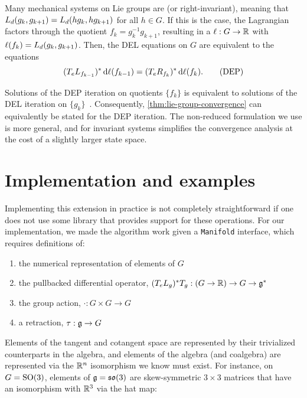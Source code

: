 \begin{remark}\label{rmk:lie-DEP}
	Many mechanical systems on Lie groups are  (or right-invariant), meaning that $L_d(g_k, g_{k+1}) = L_d(h g_k, h g_{k+1})$ for all $h \in G$. If this is the case, the Lagrangian factors through the quotient $f_k = g_k^{-1} g_{k+1}$, resulting in a  $\ell : G \to {\mathbb{R}}$ with $\ell(f_k) = L_d(g_k, g_{k+1})$.
	Then, the DEL equations on $G$ are equivalent to the  equations~\cite[\S3.4]{satomartindealmagroDiscreteMechanicsForced2020}
	\begin{equation}
		(T_e L_{f_{k-1}})^* \odif{\ell(f_{k-1})} = (T_e R_{f_k})^* \odif{\ell(f_k)}.
		\tag{DEP}
		\label{eq:lie-DEP}
	\end{equation}
	
	Solutions of the DEP iteration on quotients $\{f_k\}$ is equivalent to solutions of the DEL iteration on $\{g_k\}$~\cite[Thm.~2.1]{marsdenDiscreteEulerPoincareLiePoisson1999}.
	Consequently, \cref{thm:lie-group-convergence} can equivalently be stated for the DEP iteration. The non-reduced formulation we use is more general, and for invariant systems simplifies the convergence analysis at the cost of a slightly larger state space.
\end{remark}

\section{Implementation and examples}\label{sec:lie-examples}

Implementing this extension in practice is not completely straightforward if one does not use some library that provides support for these operations. For our implementation, we made the algorithm work given a \verb|Manifold| interface, which requires definitions of:
\begin{enumerate}
	\item the numerical representation of elements of $G$
	\item the pullbacked differential operator, $(T_e L_g)^* T_g : (G \to {\mathbb{R}}) \to G \to {\mathfrak{g}}^* $
	\item the group action, $\cdot : G \times G \to G$
	\item a retraction, $\tau : {\mathfrak{g}} \to G $
\end{enumerate}

Elements of the tangent and cotangent space are represented by their trivialized counterparts in the algebra, and elements of the algebra (and coalgebra) are represented via the ${\mathbb{R}}^n$ isomorphism we know must exist. For instance, on $G = \mathrm{SO}(3)$, elements of ${\mathfrak{g}} = \mathfrak{so}(3)$ are skew-symmetric $3 \times 3$ matrices that have an isomorphism with ${\mathbb{R}}^3$ via the hat map:

